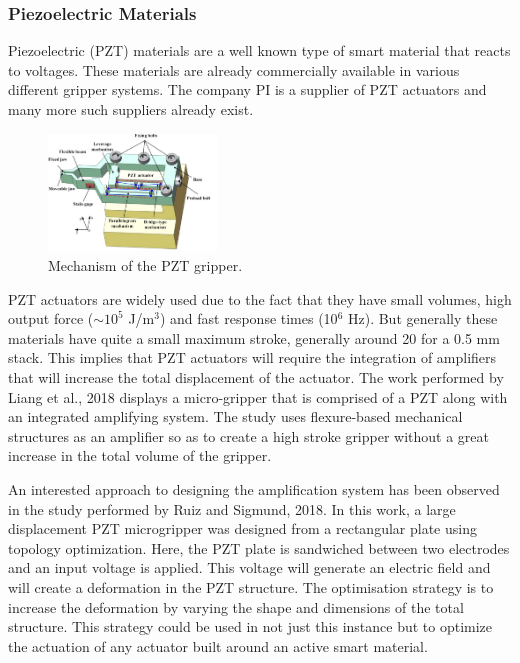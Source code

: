\subsubsection{Piezoelectric Materials}
Piezoelectric (PZT) materials are a well known type of smart material that reacts to voltages. These materials are already commercially available in various different gripper systems. The company PI\cite{noauthor_p-604_2018} is a supplier of PZT actuators and many more such suppliers already exist.

\begin{figure}
	\centering
	\includegraphics[width=0.4\textwidth]{Figures/PZT_grip.png}
	\caption{Mechanism of the PZT gripper\cite{liang_design_2018}.}
	\label{fig:PZT_grip}
\end{figure}

PZT actuators are widely used due to the fact that they have small volumes, high output force ($\sim10^5$ J/m$^3$) and fast response times (10$^6$ Hz)\cite{faran_ferromagnetic_2016}. But generally these materials have quite a small maximum stroke, generally around 20 \micrometer for a 0.5 mm stack\cite{rupitsch_piezoelectric_2019}. This implies that PZT actuators will require the integration of amplifiers that will increase the total displacement of the actuator. The work performed by Liang et al., 2018\cite{liang_design_2018} displays a micro-gripper that is comprised of a PZT along with an integrated amplifying system. The study uses flexure-based mechanical structures as an amplifier so as to create a high stroke gripper without a great increase in the total volume of the gripper.

An interested approach to designing the amplification system has been observed in the study performed by Ruiz and Sigmund, 2018\cite{ruiz_optimal_2018}. In this work, a large displacement PZT microgripper was designed from a rectangular plate using topology optimization. Here, the PZT plate is sandwiched between two electrodes and an input voltage is applied. This voltage will generate an electric field and will create a deformation in the PZT structure. The optimisation strategy is to increase the deformation by varying the shape and dimensions of the total structure. This strategy could be used in not just this instance but to optimize the actuation of any actuator built around an active smart material.

